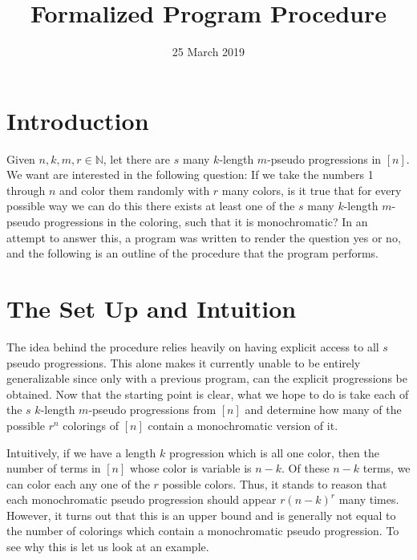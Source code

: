 \documentclass{article}
\theoremstyle{definition}
\theoremstyle{remark}
\theoremstyle{definition}
\begin{document}
\title{Formalized Program Procedure}

\date{25 March 2019}
\maketitle

\section{Introduction}

Given $n, k, m, r\in\mathbb{N}$, let there are $s$ many $k$-length $m$-pseudo progressions in $[n]$. We want are interested in the following question: If we take the numbers 1 through $n$ and color them randomly with $r$ many colors, is it true that for every possible way we can do this there exists at least one of the $s$ many $k$-length $m$-pseudo progressions in the coloring, such that it is monochromatic? In an attempt to answer this, a program was written to render the question yes or no, and the following is an outline of the procedure that the program performs. \par 

\section{The Set Up and Intuition}

The idea behind the procedure relies heavily on having explicit access to all $s$ pseudo progressions. This alone makes it currently unable to be entirely generalizable since only with a previous program, can the explicit progressions be obtained. Now that the starting point is clear, what we hope to do is take each of the $s$ $k$-length $m$-pseudo progressions from $[n]$ and determine how many of the possible $r^n$ colorings of $[n]$ contain a monochromatic version of it. \par 
Intuitively, if we have a length $k$ progression which is all one color, then the number of terms in $[n]$ whose color is variable is $n-k$. Of these $n-k$ terms, we can color each any one of the $r$ possible colors. Thus, it stands to reason that each monochromatic pseudo progression should appear $r(n-k)^r$ many times. However, it turns out that this is an upper bound and  is generally not equal to the number of colorings which contain a monochromatic pseudo progression. To see why this is let us look at an example.
\end{document}
